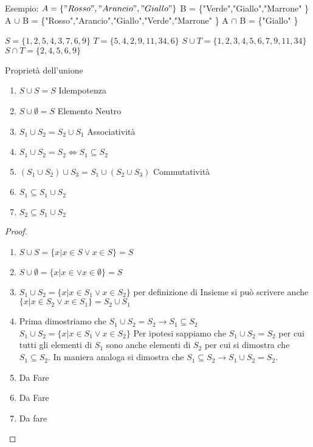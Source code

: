 Esempio:\newline
$A = \{"Rosso","Arancio","Giallo" \}$ \newline
B = \{"Verde","Giallo","Marrone" \} \newline
A $\cup$ B = \{"Rosso","Arancio","Giallo","Verde","Marrone" \}\newline
A $\cap$ B = \{"Giallo" \}

$S = \{1,2,5,4,3,7,6,9\}$
$T = \{5,4,2,9,11,34,6\}$
$S \cup T = \{1,2,3,4,5,6,7,9,11,34\}$
$S \cap T = \{2,4,5,6,9\}$

\begin{prop}
Proprietà dell'unione
\begin{enumerate}
\item $S \cup S = S$ \quad Idempotenza
\item $S \cup \emptyset = S$ \quad Elemento Neutro
\item $S_1 \cup S_2 = S_2 \cup S_1$ \quad Associatività
\item $S_1 \cup S_2 = S_2 \iff S_1 \subseteq S_2$
\item $(S_1 \cup S_2) \cup S_3 = S_1 \cup (S_2 \cup S_3)$ \quad Commutatività
\item $S_1 \subseteq S_1 \cup S_2$
\item $S_2 \subseteq S_1 \cup S_2$
\end{enumerate}
\end{prop}

\begin{proof}
\begin{enumerate}
    \item $S \cup S = \{ x | x \in S \lor x \in S \} = S$
    \item $S \cup \emptyset = \{ x | x \in \lor x \in \emptyset \} = S$
    \item $S_1 \cup S_2 = \{ x | x \in S_1 \lor x \in S_2 \}$ per definizione di Insieme
           si può scrivere anche $\{ x | x \in S_2 \lor x \in S_1 \} = S_2 \cup S_1$
    \item Prima dimostriamo che $S_1 \cup S_2 = S_2 \rightarrow S_1 \subseteq S_2$
          $S_1 \cup S_2 = \{ x | x \in S_1 \lor x \in S_2 \}$
          Per ipotesi sappiamo che $S_1 \cup S_2 = S_2$ per cui tutti gli elementi di $S_1$
          sono anche elementi di $S_2$ per cui si dimostra che $S_1 \subseteq S_2$.
          In maniera analoga si dimostra che $S_1 \subseteq S_2 \rightarrow S_1 \cup S_2 = S_2$.
    \item Da Fare
    \item Da Fare
    \item Da fare
\end{enumerate}
\end{proof}

